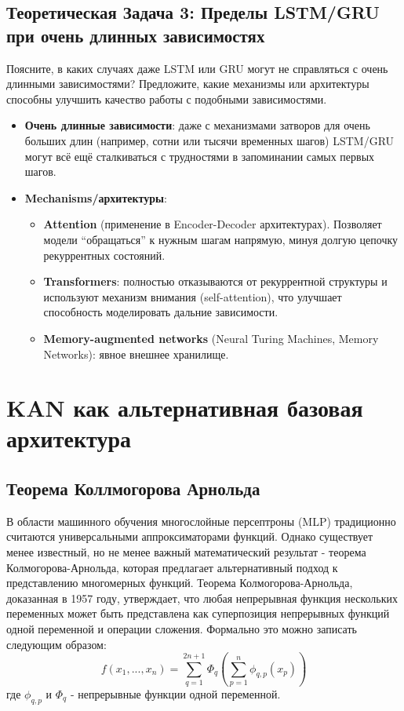 \subsection{Теоретическая Задача 3: Пределы LSTM/GRU при очень длинных зависимостях}

Поясните, в каких случаях даже LSTM или GRU могут не справляться с очень длинными зависимостями? Предложите, какие механизмы или архитектуры способны улучшить качество работы с подобными зависимостями.

\begin{itemize}
    \item \textbf{Очень длинные зависимости}: даже с механизмами затворов для очень больших длин (например, сотни или тысячи временных шагов) LSTM/GRU могут всё ещё сталкиваться с трудностями в запоминании самых первых шагов. 
    \item \textbf{Mechanisms/архитектуры}: 
    \begin{itemize}
        \item \textbf{Attention} (применение в Encoder-Decoder архитектурах). Позволяет модели ``обращаться'' к нужным шагам напрямую, минуя долгую цепочку рекуррентных состояний.
        \item \textbf{Transformers}: полностью отказываются от рекуррентной структуры и используют механизм внимания (self-attention), что улучшает способность моделировать дальние зависимости.
        \item \textbf{Memory-augmented networks} (Neural Turing Machines, Memory Networks): явное внешнее хранилище.
    \end{itemize}
\end{itemize} 

\section{KAN как альтернативная базовая архитектура}
\subsection{Теорема Коллмогорова Арнольда}

В области машинного обучения многослойные персептроны (MLP) традиционно считаются универсальными аппроксиматорами функций. Однако существует менее известный, но не менее важный математический результат - теорема Колмогорова-Арнольда, которая предлагает альтернативный подход к представлению многомерных функций.
Теорема Колмогорова-Арнольда, доказанная в 1957 году, утверждает, что любая непрерывная функция нескольких переменных может быть представлена как суперпозиция непрерывных функций одной переменной и операции сложения. Формально это можно записать следующим образом:
\[
f(x_1, ..., x_n) = \sum_{q=1}^{2n+1} \Phi_q \left(\sum_{p=1}^n \phi_{q,p}(x_p)\right)
\]
где $\phi_{q,p}$ и $\Phi_q $ - непрерывные функции одной переменной.

